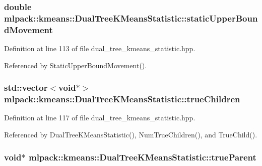 \subsubsection[{static\+Upper\+Bound\+Movement}]{\setlength{\rightskip}{0pt plus 5cm}double mlpack\+::kmeans\+::\+Dual\+Tree\+K\+Means\+Statistic\+::static\+Upper\+Bound\+Movement\hspace{0.3cm}{\ttfamily [private]}}\label{classmlpack_1_1kmeans_1_1DualTreeKMeansStatistic_a2170f4720024d33ee273c5bee57a0747}


Definition at line 113 of file dual\+\_\+tree\+\_\+kmeans\+\_\+statistic.\+hpp.



Referenced by Static\+Upper\+Bound\+Movement().

\subsubsection[{true\+Children}]{\setlength{\rightskip}{0pt plus 5cm}std\+::vector$<$void$\ast$$>$ mlpack\+::kmeans\+::\+Dual\+Tree\+K\+Means\+Statistic\+::true\+Children\hspace{0.3cm}{\ttfamily [private]}}\label{classmlpack_1_1kmeans_1_1DualTreeKMeansStatistic_a3328ed9b4043bcf90d50501aa594c855}


Definition at line 117 of file dual\+\_\+tree\+\_\+kmeans\+\_\+statistic.\+hpp.



Referenced by Dual\+Tree\+K\+Means\+Statistic(), Num\+True\+Children(), and True\+Child().

\subsubsection[{true\+Parent}]{\setlength{\rightskip}{0pt plus 5cm}void$\ast$ mlpack\+::kmeans\+::\+Dual\+Tree\+K\+Means\+Statistic\+::true\+Parent\hspace{0.3cm}{\ttfamily [private]}}\label{classmlpack_1_1kmeans_1_1DualTreeKMeansStatistic_a79835f8f57ce352b38ff37abc888e88c}



